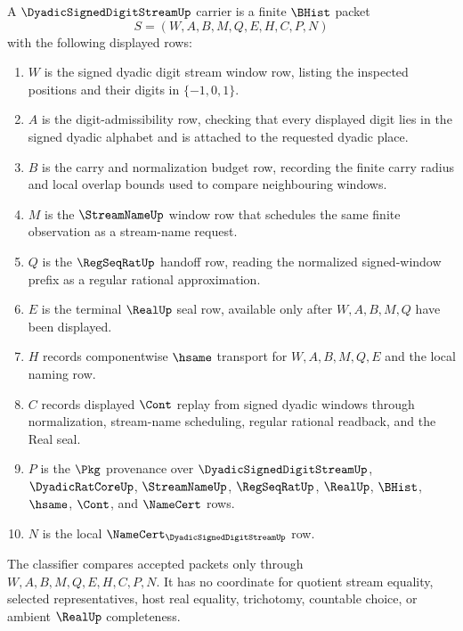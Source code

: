 \begin{definition}
\label{def:dyadic-signed-digit-stream-carrier}
A $\DyadicSignedDigitStreamUp$ carrier is a finite $\BHist$ packet
$$
S=(W,A,B,M,Q,E,H,C,P,N)
$$
with the following displayed rows:
\begin{enumerate}
\item $W$ is the signed dyadic digit stream window row, listing the inspected positions and their digits in $\{-1,0,1\}$.
\item $A$ is the digit-admissibility row, checking that every displayed digit lies in the signed dyadic alphabet and is attached to the requested dyadic place.
\item $B$ is the carry and normalization budget row, recording the finite carry radius and local overlap bounds used to compare neighbouring windows.
\item $M$ is the $\StreamNameUp$ window row that schedules the same finite observation as a stream-name request.
\item $Q$ is the $\RegSeqRatUp$ handoff row, reading the normalized signed-window prefix as a regular rational approximation.
\item $E$ is the terminal $\RealUp$ seal row, available only after $W,A,B,M,Q$ have been displayed.
\item $H$ records componentwise $\hsame$ transport for $W,A,B,M,Q,E$ and the local naming row.
\item $C$ records displayed $\Cont$ replay from signed dyadic windows through normalization, stream-name scheduling, regular rational readback, and the Real seal.
\item $P$ is the $\Pkg$ provenance over $\DyadicSignedDigitStreamUp$, $\DyadicRatCoreUp$, $\StreamNameUp$, $\RegSeqRatUp$, $\RealUp$, $\BHist$, $\hsame$, $\Cont$, and $\NameCert$ rows.
\item $N$ is the local $\NameCert_{\DyadicSignedDigitStreamUp}$ row.
\end{enumerate}
The classifier compares accepted packets only through $W,A,B,M,Q,E,H,C,P,N$. It has no coordinate for quotient stream equality, selected representatives, host real equality, trichotomy, countable choice, or ambient $\RealUp$ completeness.
\end{definition}

